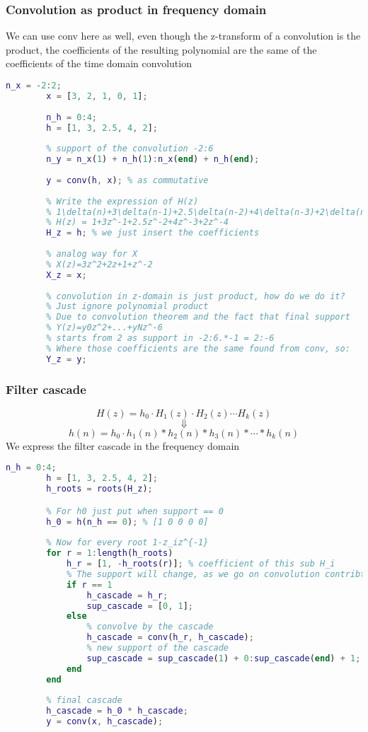     \subsubsection{Convolution as product in frequency domain}
    We can use conv here as well, even though the z-transform of a convolution is the product, the coefficients of the resulting polynomial are the same of the coefficients of the time domain convolution
    \begin{lstlisting}[language=Matlab, escapeinside=`']
        n_x = -2:2;
        x = [3, 2, 1, 0, 1];
        
        n_h = 0:4;
        h = [1, 3, 2.5, 4, 2];
        
        % support of the convolution -2:6
        n_y = n_x(1) + n_h(1):n_x(end) + n_h(end);
        
        y = conv(h, x); % as commutative
        
        % Write the expression of H(z)
        % 1\delta(n)+3\delta(n-1)+2.5\delta(n-2)+4\delta(n-3)+2\delta(n-4)
        % H(z) = 1+3z^-1+2.5z^-2+4z^-3+2z^-4
        H_z = h; % we just insert the coefficients
        
        % analog way for X
        % X(z)=3z^2+2z+1+z^-2
        X_z = x;
        
        % convolution in z-domain is just product, how do we do it?
        % Just ignore polynomial product
        % Due to convolution theorem and the fact that final support
        % Y(z)=y0z^2+...+yNz^-6
        % starts from 2 as support in -2:6.*-1 = 2:-6
        % Where those coefficients are the same found from conv, so:
        Y_z = y;
    \end{lstlisting}

    \subsubsection{Filter cascade}
    $$
    H(z)=h_0\cdot H_1(z)\cdot H_2(z)\cdots H_k(z)
    $$
    $$
    \Downarrow
    $$
    $$
    h(n)=h_0\cdot h_1(n)*h_2(n)*h_3(n)*\cdots*h_k(n)
    $$
    We express the filter cascade in the frequency domain
    \begin{lstlisting}[language=Matlab, escapeinside=`']
        n_h = 0:4;
        h = [1, 3, 2.5, 4, 2];
        h_roots = roots(H_z);

        % For h0 just put when support == 0
        h_0 = h(n_h == 0); % [1 0 0 0 0]
        
        % Now for every root 1-z_iz^{-1}
        for r = 1:length(h_roots)
            h_r = [1, -h_roots(r)]; % coefficient of this sub H_i
            % The support will change, as we go on convolution contribtion
            if r == 1
                h_cascade = h_r;
                sup_cascade = [0, 1];
            else
                % convolve by the cascade
                h_cascade = conv(h_r, h_cascade);
                % new support of the cascade
                sup_cascade = sup_cascade(1) + 0:sup_cascade(end) + 1;
            end
        end
        
        % final cascade
        h_cascade = h_0 * h_cascade;
        y = conv(x, h_cascade);
    \end{lstlisting}

